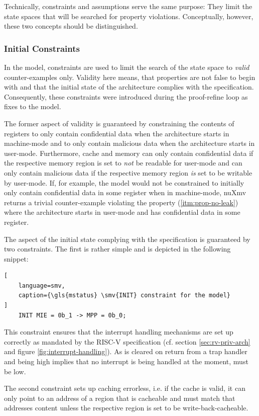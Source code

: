 Technically,  constraints and assumptions serve the same purpose: They limit the state spaces that will be searched for property violations.
Conceptually, however, these two concepts should be distinguished.

\subsubsection{Initial Constraints}

In the model,  constraints are used to limit the search of the state space to \textit{valid} counter-examples only.
Validity here means, that properties are not false to begin with and that the initial state of the architecture complies with the specification.
Consequently, these constraints were introduced during the proof-refine loop as fixes to the model.

The former aspect of validity is guaranteed by constraining the contents of registers to only contain confidential data when the architecture starts in machine-mode and to only contain malicious data when the architecture starts in user-mode.
Furthermore, cache and memory can only contain confidential data if the respective memory region is set to \textit{not} be readable for user-mode and can only contain malicious data if the respective memory region \textit{is} set to be writable by user-mode.
If, for example, the model would not be constrained to initially only contain confidential data in some register when in machine-mode, nuXmv returns a trivial counter-example violating the  property (\ref{itm:prop-no-leak}) where the architecture starts in user-mode and has confidential data in some register.

The aspect of the initial state complying with the specification is guaranteed by two constraints.
The first is rather simple and is depicted in the following snippet:
\begin{lstlisting}[
    language=smv,
    caption={\gls{mstatus} \smv{INIT} constraint for the model}
]
    INIT MIE = 0b_1 -> MPP = 0b_0;
\end{lstlisting}
This constraint ensures that the interrupt handling mechanisms are set up correctly as mandated by the RISC-V specification (cf. section \ref{sec:rv-priv-arch} and figure \ref{fig:interrupt-handling}).
As  is cleared on return from a trap handler and  being high implies that no interrupt is being handled at the moment,  must be low.

The second constraint sets up caching errorless, i.e. if the cache is valid, it can only point to an address of a region that is cacheable and must match that addresses content unless the respective region is set to be write-back-cacheable.

